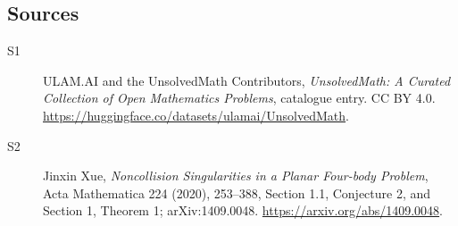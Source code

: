 \documentclass[11pt]{article}
\begin{document}
\subsection{Sources}
\begin{description}
\item[\hypertarget{source:statement:1}{S1}] ULAM.AI and the UnsolvedMath Contributors, \emph{UnsolvedMath: A Curated Collection of Open Mathematics Problems}, catalogue entry. CC BY 4.0. \url{https://huggingface.co/datasets/ulamai/UnsolvedMath}.
\item[\hypertarget{source:statement:2}{S2}] Jinxin Xue, \emph{Noncollision Singularities in a Planar Four-body Problem}, Acta Mathematica 224 (2020), 253--388, Section 1.1, Conjecture 2, and Section 1, Theorem 1; arXiv:1409.0048. \url{https://arxiv.org/abs/1409.0048}.
\end{description}
\label{end:statement}
\end{document}
